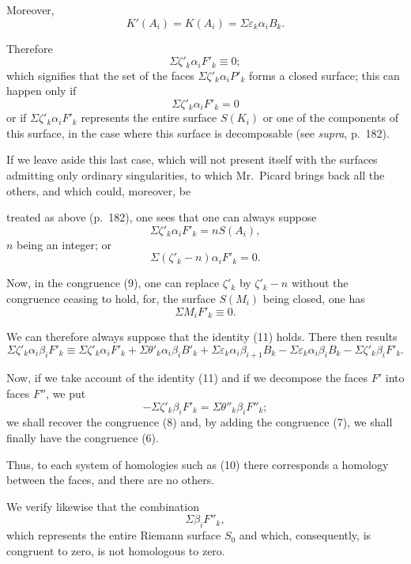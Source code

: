 \documentclass{article}
\begin{document}
Moreover,
\[ K'(A_{i}) = K(A_{i}) = \Sigma \varepsilon_{k} \alpha_{i}B_{k}. \]

Therefore
\[ \Sigma \zeta'_{k} \alpha_{i}F'_{k} \equiv 0; \]
which signifies that the set of the faces $\Sigma \zeta'_{k} \alpha_{i}P'_{k}$ forms a closed surface; this can happen only if
\[ \Sigma \zeta'_{k} \alpha_{i}F'_{k} = 0 \tag{11} \]
or if $\Sigma \zeta'_{k} \alpha_{i}F'_{k}$ represents the entire surface $S(K_{i})$ or one of the components of this surface, in the case where this surface is decomposable (see \emph{supra}, p.\ 182).

If we leave aside this last case, which will not present itself with the surfaces admitting only ordinary singularities, to which Mr.~Picard brings back all the others, and which could, moreover, be

treated as above (p.\ 182), one sees that one can always suppose
\[ \Sigma \zeta'_{k} \alpha_{i}F'_{k} = nS(A_{i}), \]
$n$ being an integer; or
\[ \Sigma(\zeta'_{k} - n)\alpha_{i}F'_{k} = 0. \]

Now, in the congruence (9), one can replace $\zeta'_{k}$ by $\zeta'_{k} - n$ without the congruence ceasing to hold, for, the surface $S(M_{i})$ being closed, one has
\[ \Sigma M_{i}F'_{k} \equiv 0. \]

We can therefore always suppose that the identity (11) holds. There then results
\[ \Sigma \zeta'_{k} \alpha_{i}\beta_{i}F'_{k} \equiv \Sigma \zeta'_{k} \alpha_{i}F'_{k} + \Sigma \theta'_{k} \alpha_{i}\beta_{i}B'_{k} + \Sigma \varepsilon_{k} \alpha_{i}\beta_{i+1}B_{k} - \Sigma \varepsilon_{k} \alpha_{i}\beta_{i}B_{k} - \Sigma \zeta'_{k} \beta_{i}F'_{k}. \]

Now, if we take account of the identity (11) and if we decompose the faces $F'$ into faces $F''$, we put
\[ -\Sigma \zeta'_{k} \beta_{i}F'_{k} = \Sigma \theta''_{k} \beta_{i}F''_{k}; \]
we shall recover the congruence (8) and, by adding the congruence (7), we shall finally have the congruence (6).

Thus, to each system of homologies such as (10) there corresponds a homology between the faces, and there are no others.

We verify likewise that the combination
\[ \Sigma \beta_{i}F''_{k}, \]
which represents the entire Riemann surface $S_{0}$ and which, consequently, is congruent to zero, is not homologous to zero.
\end{document}
